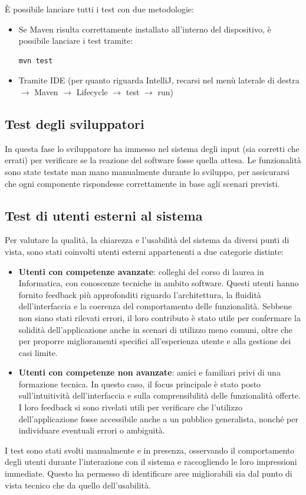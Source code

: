 \documentclass[a4paper]{article}
\begin{document}
È possibile lanciare tutti i test con due metodologie:

\begin{itemize}
    \item Se Maven risulta correttamente installato all'interno del dispositivo, è possibile lanciare i test tramite:
    \begin{lstlisting}[style=bash-style, caption={Esecuzione test tramite Maven}]
mvn test
    \end{lstlisting}
    \item Tramite IDE (per quanto riguarda IntelliJ, recarsi nel menù laterale di destra $\rightarrow$ Maven $\rightarrow$ Lifecycle $\rightarrow$ test $\rightarrow$ run)
\end{itemize}

\subsection{Test degli sviluppatori}
In questa fase lo sviluppatore ha immesso nel sistema degli input (sia corretti che errati) per verificare se la reazione del software fosse quella attesa. Le funzionalità sono state testate man mano manualmente durante lo sviluppo, per assicurarsi che ogni componente rispondesse correttamente in base agli scenari previsti.

\subsection{Test di utenti esterni al sistema}
Per valutare la qualità, la chiarezza e l’usabilità del sistema da diversi punti di vista, sono stati coinvolti utenti esterni appartenenti a due categorie distinte:

\begin{itemize}
    \item \textbf{Utenti con competenze avanzate}: colleghi del corso di laurea in Informatica, con conoscenze tecniche in ambito software. Questi utenti hanno fornito feedback più approfonditi riguardo l’architettura, la fluidità dell’interfaccia e la coerenza del comportamento delle funzionalità. Sebbene non siano stati rilevati errori, il loro contributo è stato utile per confermare la solidità dell’applicazione anche in scenari di utilizzo meno comuni, oltre che per proporre miglioramenti specifici all’esperienza utente e alla gestione dei casi limite.

    \item \textbf{Utenti con competenze non avanzate}: amici e familiari privi di una formazione tecnica. In questo caso, il focus principale è stato posto sull’intuitività dell’interfaccia e sulla comprensibilità delle funzionalità offerte. I loro feedback si sono rivelati utili per verificare che l’utilizzo dell’applicazione fosse accessibile anche a un pubblico generalista, nonché per individuare eventuali errori o ambiguità.

\end{itemize}

I test sono stati svolti manualmente e in presenza, osservando il comportamento degli utenti durante l’interazione con il sistema e raccogliendo le loro impressioni immediate. Questo ha permesso di identificare aree migliorabili sia dal punto di vista tecnico che da quello dell’usabilità.
\end{document}
